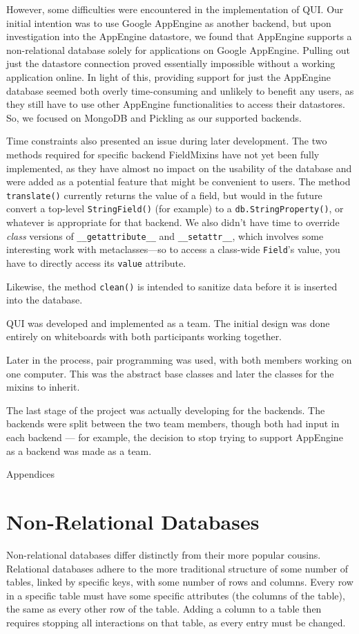 \documentclass{article} %
\newcommand{\il}[1]{\mbox{\lstinline{#1}}}
\begin{document}
However, some difficulties were encountered in the implementation of QUI. Our initial intention was to use Google AppEngine as another backend, but upon investigation into the AppEngine
datastore, we found that AppEngine supports a non-relational database solely for applications on Google AppEngine. Pulling out just the datastore connection proved essentially impossible 
without a working application online. In light of this, providing support for just the AppEngine database seemed both overly time-consuming and unlikely to benefit any users, as they
still have to use other AppEngine functionalities to access their datastores. So, we focused on MongoDB and Pickling as our supported backends.

Time constraints also presented an issue during later development. The two methods required for specific backend FieldMixins have not yet been fully implemented, as 
they have almost no impact on the usability of the database and were added as a potential feature that might be convenient to users. The method \il{translate()} currently returns the 
value of a field, but would in the future convert a top-level \il{StringField()} (for example) to a \il{db.StringProperty()}, or whatever is appropriate for that backend. We also didn't have
time to override \emph{class} versions of \il{__getattribute__} and \il{__setattr__}, which involves some interesting work with metaclasses---so to access a class-wide \il{Field}'s value, 
you have to directly access its \il{value} attribute.

Likewise, the method \il{clean()} is intended to sanitize data before it is inserted into the database.

QUI was developed and implemented as a team. The initial design was done entirely on whiteboards with both participants working together.

  Later in the process, pair programming was used, with both members working on one computer. This was the abstract base classes and later the classes for the mixins to inherit. 
  
  The last stage of the project was actually developing for the backends. The backends were split between the two team members, though both had input in each backend --- for example, the
   decision to stop trying to support AppEngine as a backend was made as a team.

\newpage
\appendix
\begin{center}Appendices\end{center}

\section{Non-Relational Databases}
Non-relational databases differ distinctly from their more popular cousins. Relational databases adhere to the more traditional structure of some number of tables, linked
by specific keys, with some number of rows and columns. Every row in a specific table must have some specific attributes (the columns of the table), the same as every 
other row of the table. Adding a column to a table then requires stopping all interactions on that table, as every entry must be changed. 
\end{document}

